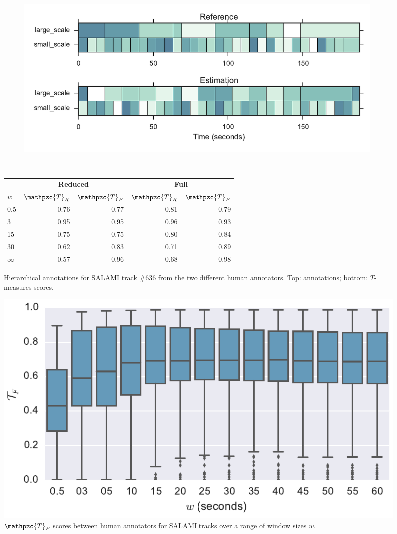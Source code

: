 \documentclass{article}
\def\shag{\ensuremath{\mathpzc{T}}}
\begin{document}
\begin{figure}[t]
  \centering
  \begin{subfigure}{0.5\textwidth}
    \centering
    \includegraphics[width=0.99\textwidth]{figs/SALAMI-SALAMI.pdf}
  \end{subfigure}%
  \\
  \begin{minipage}{0.5\textwidth}
    \small
    \centering
    \vspace{10pt}
    \begin{tabular}{l|rr|rr}
      & \multicolumn{2}{c|}{\textbf{Reduced}} & \multicolumn{2}{c}{\textbf{Full}} \\
      $w$       & $\shag_R$    & $\shag_P$  & $\shag_R$ & $\shag_P$    \\
      \hline
      0.5       & 0.76       & 0.77      & 0.81 & 0.79\\     
      3         & 0.95       & 0.95      & 0.96 & 0.93\\
      15        & 0.75       & 0.75     & 0.80 & 0.84\\
      30        & 0.62       & 0.83     & 0.71 & 0.89\\
      $\infty$  & 0.57       & 0.96 & 0.68 & 0.98
    \end{tabular}
  \end{minipage}
  \caption{Hierarchical annotations for SALAMI track \#636 from the two different human
  annotators. Top: annotations; bottom: $T$-measures scores.}
  \label{fig:SALAMI-SALAMI}
\end{figure}

\begin{figure}
    \centering
    \includegraphics[width=\columnwidth]{figs/tfw}
    \caption{$\shag_F$ scores between human annotators for SALAMI tracks over a range of window sizes $w$.\label{fig:salami-agree}}
\end{figure}
\end{document}

